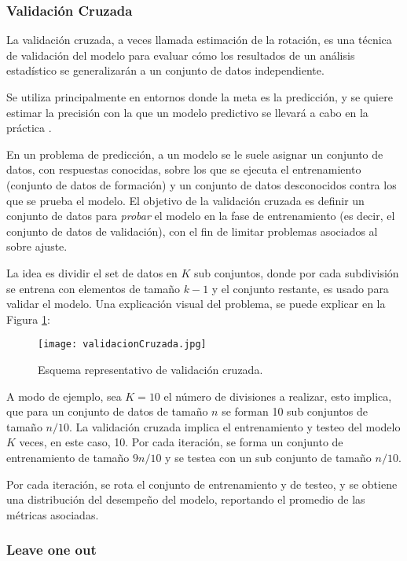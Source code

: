 \subsubsection{Validación Cruzada}

La validación cruzada, a veces llamada estimación de la rotación, es una técnica de validación del
modelo para evaluar cómo los resultados de un análisis estadístico se generalizarán a un conjunto de datos independiente. 

Se utiliza principalmente en entornos donde la meta es la predicción, y se
quiere estimar la precisión con la que un modelo predictivo se llevará a cabo en la práctica \cite{golub1979generalized}. 

En un problema de predicción, a un modelo se le suele asignar un conjunto de datos, con respuestas conocidas, sobre los que se ejecuta el entrenamiento (conjunto de datos de formación) y un conjunto de datos desconocidos contra los que se prueba el modelo. El objetivo de la validación cruzada es definir un conjunto de datos para \textit{probar} el modelo en la fase de entrenamiento (es decir, el conjunto de datos de validación), con el fin de limitar problemas asociados al sobre ajuste.

La idea es dividir el set de datos en $K$ sub conjuntos, donde por cada subdivisión se entrena con elementos de tamaño $k-1$ y el conjunto restante, es usado para validar el modelo. Una explicación visual del problema, se puede explicar en la Figura  \ref{VC}:

\begin{figure}[!h]
	\centering
	\texttt{[image: validacionCruzada.jpg]}
	\caption{Esquema representativo de validación cruzada.}
	\label{VC}
\end{figure}

A modo de ejemplo, sea $K=10$ el número de divisiones a realizar, esto implica, que para un conjunto de datos de tamaño $n$ se forman 10 sub conjuntos de tamaño $n/10$. La validación cruzada implica el entrenamiento y testeo del modelo $K$ veces, en este caso, 10. Por cada iteración, se forma un conjunto de entrenamiento de tamaño $9n/10$ y se testea con un sub conjunto de tamaño $n/10$. 

Por cada iteración, se rota el conjunto de entrenamiento y de testeo, y se obtiene una distribución del desempeño del modelo, reportando el promedio de las métricas asociadas.

\subsubsection{Leave one out}

